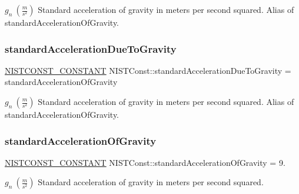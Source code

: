 $g_n \ (\frac{m}{s^2})$ Standard acceleration of gravity in meters per second squared. Alias of standard\+Acceleration\+Of\+Gravity. \mbox{\label{group___n_i_s_t_const-_gravity_acceleration_ga33716b656e3985cab5dad9e932201279}} 
\subsubsection{\texorpdfstring{standard\+Acceleration\+Due\+To\+Gravity}{standardAccelerationDueToGravity}}
{\footnotesize\ttfamily \mbox{\hyperlink{group___n_i_s_t_const-_macros_ga2b0fc1d7452373f816175dd86ce26729}{N\+I\+S\+T\+C\+O\+N\+S\+T\+\_\+\+C\+O\+N\+S\+T\+A\+NT}} N\+I\+S\+T\+Const\+::standard\+Acceleration\+Due\+To\+Gravity = standard\+Acceleration\+Of\+Gravity}

$g_n \ (\frac{m}{s^2})$ Standard acceleration of gravity in meters per second squared. Alias of standard\+Acceleration\+Of\+Gravity. \mbox{\label{group___n_i_s_t_const-_gravity_acceleration_ga22b6c6320ba235b01a0c0a1b3f9fd043}} 
\subsubsection{\texorpdfstring{standard\+Acceleration\+Of\+Gravity}{standardAccelerationOfGravity}}
{\footnotesize\ttfamily \mbox{\hyperlink{group___n_i_s_t_const-_macros_ga2b0fc1d7452373f816175dd86ce26729}{N\+I\+S\+T\+C\+O\+N\+S\+T\+\_\+\+C\+O\+N\+S\+T\+A\+NT}} N\+I\+S\+T\+Const\+::standard\+Acceleration\+Of\+Gravity = 9.}

$g_n \ (\frac{m}{s^2})$ Standard acceleration of gravity in meters per second squared. 